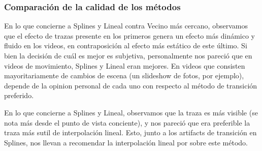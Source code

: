 %

\subsubsection{Comparaci\'on de la calidad de los m\'etodos}
\par En lo que concierne a Splines y Lineal contra Vecino m\'as cercano, observamos que el efecto de trazas presente en los primeros genera un efecto m\'as din\'amico y fluido en los videos, en contraposici\'on al efecto m\'as est\'atico de este \'ultimo.
Si bien la decisi\'on de cu\'al es mejor es subjetiva, personalmente nos pareci\'o que en videos de movimiento, Splines y Lineal eran mejores.
En videos que consisten mayoritariamente de cambios de escena (un slideshow de fotos, por ejemplo), depende de la opinion personal de cada uno con respecto al m\'etodo de transici\'on preferido.
\par En lo que concierne a Splines y Lineal, observamos que la traza es m\'as visible (se nota m\'as desde el punto de vista conciente), y nos pareci\'o que era preferible la traza m\'as sutil de interpolaci\'on lineal.
Esto, junto a los artifacts de transici\'on en Splines, nos llevan a recomendar la interpolaci\'on lineal por sobre este m\'etodo.
